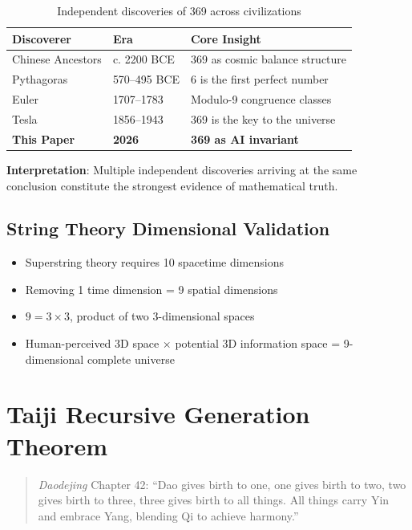 \documentclass[conference]{IEEEtran}
\theoremstyle{remark}
\begin{document}
\begin{table}[h]
\centering
\caption{Independent discoveries of 369 across civilizations}
\label{tab:cross}
\begin{tabular}{p{2cm}p{2cm}p{2.5cm}}
\toprule
Discoverer & Era & Core Insight \\
\midrule
Chinese Ancestors & c. 2200 BCE & 369 as cosmic balance structure \\
Pythagoras & 570--495 BCE & 6 is the first perfect number \\
Euler & 1707--1783 & Modulo-9 congruence classes \\
Tesla & 1856--1943 & 369 is the key to the universe \\
\textbf{This Paper} & \textbf{2026} & \textbf{369 as AI invariant} \\
\bottomrule
\end{tabular}
\end{table}

\textbf{Interpretation}: Multiple independent discoveries arriving at the same conclusion constitute the strongest evidence of mathematical truth.

\subsection{String Theory Dimensional Validation}
\begin{itemize}[nosep]
\item Superstring theory requires 10 spacetime dimensions
\item Removing 1 time dimension = 9 spatial dimensions
\item $9 = 3 \times 3$, product of two 3-dimensional spaces
\item Human-perceived 3D space $\times$ potential 3D information space = 9-dimensional complete universe
\end{itemize}

\section{Taiji Recursive Generation Theorem}

\begin{quote}
\emph{Daodejing} Chapter 42: ``Dao gives birth to one, one gives birth to two, two gives birth to three, three gives birth to all things. All things carry Yin and embrace Yang, blending Qi to achieve harmony.''
\end{quote}
\end{document}
